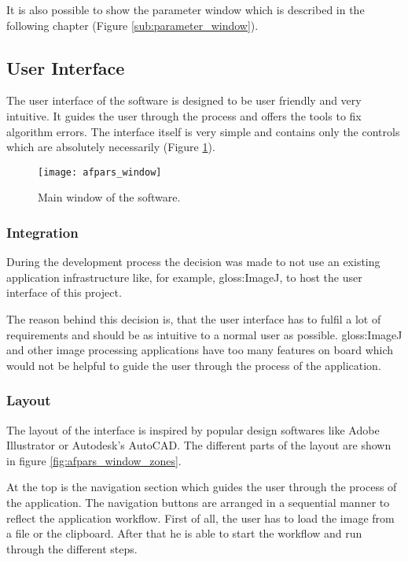 It is also possible to show the parameter window which is described in the following chapter (Figure \ref{sub:parameter_window}).

\subsection{User Interface}
\label{sub:userInterface}

The user interface of the software is designed to be user friendly and very intuitive. It guides the user through the process and offers the tools to fix algorithm errors. The interface itself is very simple and contains only the controls which are absolutely necessarily (Figure \ref{fig:afpars_window}).

\begin{figure}[h!]
  \centering
      \texttt{[image: afpars\_window]}
  \caption{Main window of the software.}
  \label{fig:afpars_window}
\end{figure}

\subsubsection{Integration}
During the development process the decision was made to not use an existing application infrastructure like, for example, \gls{gloss:ImageJ}, to host the user interface of this project.

The reason behind this decision is, that the user interface has to fulfil a lot of requirements and should be as intuitive to a normal user as possible. \gls{gloss:ImageJ} and other image processing applications have too many features on board which would not be helpful to guide the user through the process of the application.

\subsubsection{Layout}

The layout of the interface is inspired by popular design softwares like Adobe Illustrator or Autodesk's AutoCAD. The different parts of the layout are shown in figure \ref{fig:afpars_window_zones}.

At the top is the navigation section which guides the user through the process of the application. The navigation buttons are arranged in a sequential manner to reflect the application workflow. First of all, the user has to load the image from a file or the clipboard. After that he is able to start the workflow and run through the different steps.

